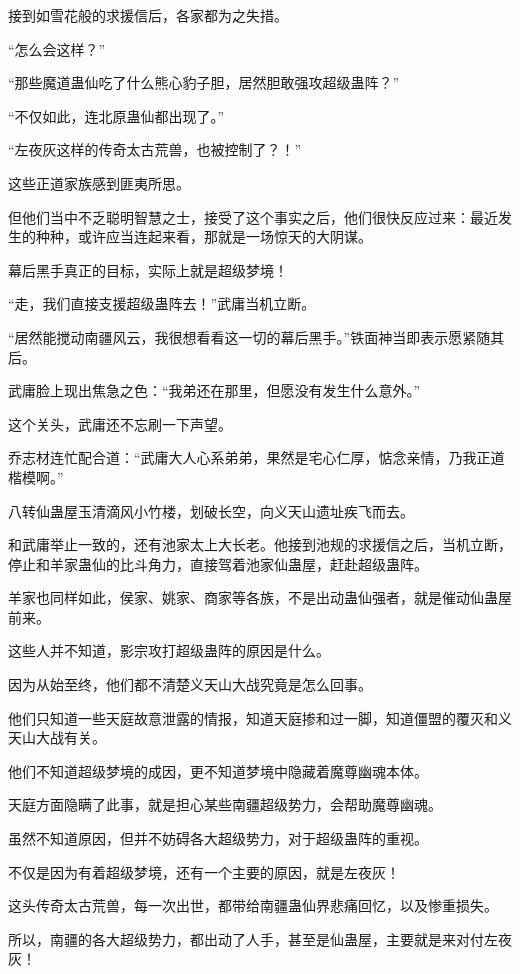 \begin{this_body}
接到如雪花般的求援信后，各家都为之失措。

“怎么会这样？”

“那些魔道蛊仙吃了什么熊心豹子胆，居然胆敢强攻超级蛊阵？”

“不仅如此，连北原蛊仙都出现了。”

“左夜灰这样的传奇太古荒兽，也被控制了？！”

这些正道家族感到匪夷所思。

但他们当中不乏聪明智慧之士，接受了这个事实之后，他们很快反应过来：最近发生的种种，或许应当连起来看，那就是一场惊天的大阴谋。

幕后黑手真正的目标，实际上就是超级梦境！

“走，我们直接支援超级蛊阵去！”武庸当机立断。

“居然能搅动南疆风云，我很想看看这一切的幕后黑手。”铁面神当即表示愿紧随其后。

武庸脸上现出焦急之色：“我弟还在那里，但愿没有发生什么意外。”

这个关头，武庸还不忘刷一下声望。

乔志材连忙配合道：“武庸大人心系弟弟，果然是宅心仁厚，惦念亲情，乃我正道楷模啊。”

八转仙蛊屋玉清滴风小竹楼，划破长空，向义天山遗址疾飞而去。

和武庸举止一致的，还有池家太上大长老。他接到池规的求援信之后，当机立断，停止和羊家蛊仙的比斗角力，直接驾着池家仙蛊屋，赶赴超级蛊阵。

羊家也同样如此，侯家、姚家、商家等各族，不是出动蛊仙强者，就是催动仙蛊屋前来。

这些人并不知道，影宗攻打超级蛊阵的原因是什么。

因为从始至终，他们都不清楚义天山大战究竟是怎么回事。

他们只知道一些天庭故意泄露的情报，知道天庭掺和过一脚，知道僵盟的覆灭和义天山大战有关。

他们不知道超级梦境的成因，更不知道梦境中隐藏着魔尊幽魂本体。

天庭方面隐瞒了此事，就是担心某些南疆超级势力，会帮助魔尊幽魂。

虽然不知道原因，但并不妨碍各大超级势力，对于超级蛊阵的重视。

不仅是因为有着超级梦境，还有一个主要的原因，就是左夜灰！

这头传奇太古荒兽，每一次出世，都带给南疆蛊仙界悲痛回忆，以及惨重损失。

所以，南疆的各大超级势力，都出动了人手，甚至是仙蛊屋，主要就是来对付左夜灰！


\end{this_body}
